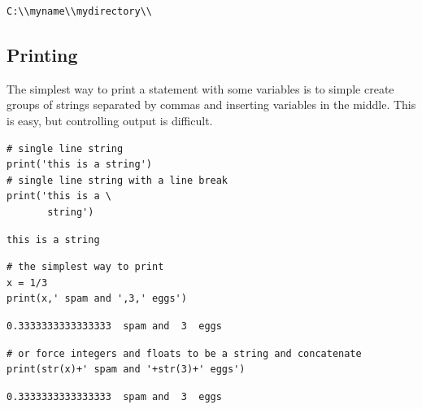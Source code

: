 \documentclass[%
oneside,                 %
final,                   %
10pt]{article}
\begin{document}
\begin{verbatim}
C:\\myname\\mydirectory\\
\end{verbatim}

\subsection{Printing}

The simplest way to print a statement with some variables is to simple create groups of strings separated by commas and inserting variables in the middle. This is easy, but controlling output is difficult.

\begin{verbatim}
# single line string
print('this is a string')
# single line string with a line break
print('this is a \
       string')
\end{verbatim}

\begin{verbatim}
this is a string
\end{verbatim}

\begin{verbatim}
# the simplest way to print
x = 1/3
print(x,' spam and ',3,' eggs')
\end{verbatim}

\begin{verbatim}
0.3333333333333333  spam and  3  eggs
\end{verbatim}

\begin{verbatim}
# or force integers and floats to be a string and concatenate
print(str(x)+' spam and '+str(3)+' eggs')
\end{verbatim}

\begin{verbatim}
0.3333333333333333  spam and  3  eggs
\end{verbatim}
\end{document}
